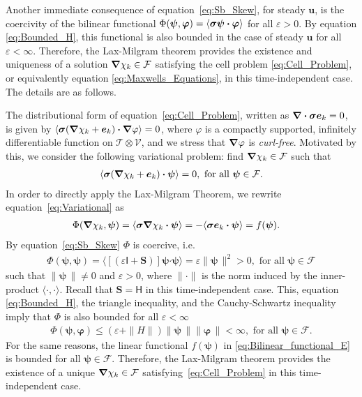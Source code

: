 \documentclass[leqno,onefignum,onetabnum]{siamltex1213}
\newcommand{\Sb}{\mathbf{S}}
\newcommand{\Tc}{\mathcal{T}}
\newcommand{\Vc}{\mathcal{V}}
\newcommand{\Fc}{\mathcal{F}}
\newcommand{\Hm}{\mathsf{H}}
\newcommand{\Ib}{\mathsf{I}}
\newcommand\bsig{\mbox{\boldmath${\sigma}$}}
\newcommand\bnabla{\mbox{\boldmath${\nabla}$}}
\providecommand\bcdot{\boldsymbol{\cdot}}
\newcommand{\vecu}{\boldsymbol{u}}
\newcommand{\vece}{\boldsymbol{e}}
\newcommand{\vecpsi}{\boldsymbol{\psi}}
\newcommand{\vecvarphi}{\boldsymbol{\varphi}}
\begin{document}
Another immediate consequence of equation~\eqref{eq:Sb_Skew}, for
steady $\vecu $, is the coercivity of the bilinear functional
$\Phi(\vecpsi,\vecvarphi)=\langle\bsig\vecpsi\bcdot\vecvarphi\rangle$ for all $\varepsilon>0$. By equation
\eqref{eq:Bounded_H}, this functional is also bounded in the case of
steady $\vecu $ for all $\varepsilon<\infty$. Therefore, the Lax-Milgram theorem
\cite{McOwen:2003:PDE} provides the existence and uniqueness of a
solution $\bnabla \chi_k\in\Fc$ satisfying the cell problem
\eqref{eq:Cell_Problem}, or equivalently equation
\eqref{eq:Maxwells_Equations}, in this time-independent case. The
details are as follows. 




The distributional form of equation~\eqref{eq:Cell_Problem}, written
as $\bnabla \bcdot\bsig\vece _k=0$, is given by
$\langle\bsig(\bnabla \chi_k+\vece _k)\bcdot\bnabla \varphi\rangle=0$, where $\varphi$ is a compactly
supported, infinitely differentiable function on $\Tc\otimes\Vc$, and we
stress that $\bnabla \varphi$ is \emph{curl-free}. Motivated by this, we
consider the following variational problem: find $\bnabla \chi_k\in\Fc$ such
that   
%
\begin{align}\label{eq:Variational}
  \langle\bsig(\bnabla \chi_k+\vece _k)\bcdot\vecpsi\rangle=0, \text{ for all }
  \vecpsi\in\Fc.
\end{align}
%
In order to directly apply the Lax-Milgram Theorem, we rewrite
equation~\eqref{eq:Variational} as 
%
\begin{align}  \label{eq:Bilinear_functional_E} 
   &\Phi(\bnabla \chi_k,\vecpsi)
     =\langle\bsig\bnabla \chi_k\bcdot\vecpsi\rangle
     =-\langle\bsig\vece_k\bcdot\vecpsi\rangle
     =f(\vecpsi). 
\end{align}
%
By equation~\eqref{eq:Sb_Skew} $\Phi$ is coercive, i.e.
%
\begin{align}\label{eq:Phi_Coercive}
  \Phi(\vecpsi,\vecpsi)=\langle[(\varepsilon\Ib+\Sb)]\vecpsi\bcdot\vecpsi\rangle=\varepsilon\|\vecpsi\,\|^2>0,
   \text{ for all } \vecpsi\in\Fc
\end{align}
%
such that $\|\vecpsi\,\|\neq0$ and $\varepsilon>0$, where $\|\cdot\|$
is the norm induced by the inner-product $\langle\cdot,\cdot\rangle$. Recall that
$\Sb=\Hm$ in this time-independent case. This, equation 
\eqref{eq:Bounded_H}, the triangle inequality,
and the Cauchy-Schwartz inequality imply that $\Phi$ is also bounded for
all $\varepsilon<\infty$
%
\begin{align}\label{eq:Phi_Bounded}
  \Phi(\vecpsi,\vecvarphi)\leq(\varepsilon+\|H\|)\|\vecpsi\,\|\|\vecvarphi\,\|<\infty,
  \text{ for all } \vecpsi\in\Fc.
\end{align}
%
For the same reasons, the linear functional $f(\vecpsi)$ in
\eqref{eq:Bilinear_functional_E} is bounded for all
$\vecpsi\in\Fc$. Therefore, the Lax-Milgram theorem
\cite{McOwen:2003:PDE} provides the existence of a unique
$\bnabla \chi_k\in\Fc$ satisfying~\eqref{eq:Cell_Problem} in this
time-independent case. 
\end{document}
